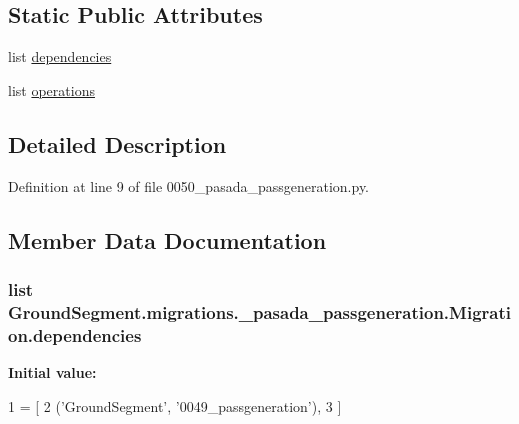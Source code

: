 \subsection*{Static Public Attributes}
\begin{DoxyCompactItemize}
\item 
list \hyperlink{class_ground_segment_1_1migrations_1_10050__pasada__passgeneration_1_1_migration_a623eb546c1f97f50475b4bc79d98e9b8}{dependencies}
\item 
list \hyperlink{class_ground_segment_1_1migrations_1_10050__pasada__passgeneration_1_1_migration_a431260fad3aa000779e1cdbc21cd4130}{operations}
\end{DoxyCompactItemize}


\subsection{Detailed Description}


Definition at line 9 of file 0050\+\_\+pasada\+\_\+passgeneration.\+py.



\subsection{Member Data Documentation}
\hypertarget{class_ground_segment_1_1migrations_1_10050__pasada__passgeneration_1_1_migration_a623eb546c1f97f50475b4bc79d98e9b8}{}
\subsubsection[{dependencies}]{\setlength{\rightskip}{0pt plus 5cm}list Ground\+Segment.\+migrations.\+\_\+pasada\+\_\+passgeneration.\+Migration.\+dependencies\hspace{0.3cm}{\ttfamily [static]}}\label{class_ground_segment_1_1migrations_1_10050__pasada__passgeneration_1_1_migration_a623eb546c1f97f50475b4bc79d98e9b8}
{\bfseries Initial value\+:}
\begin{DoxyCode}
1 = [
2         (\textcolor{stringliteral}{'GroundSegment'}, \textcolor{stringliteral}{'0049\_passgeneration'}),
3     ]
\end{DoxyCode}


